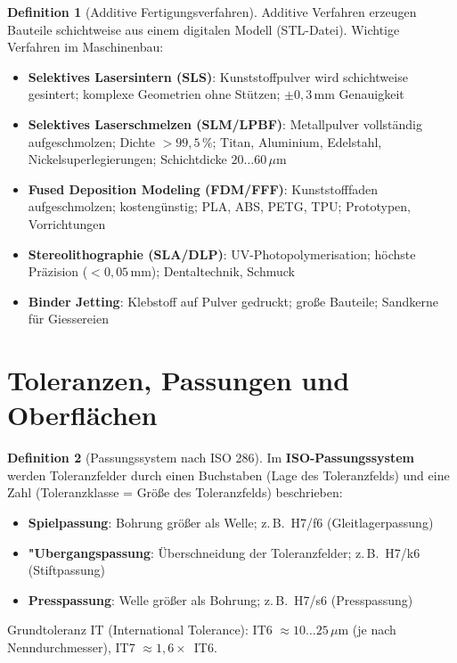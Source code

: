 ﻿\documentclass[a4paper,12pt]{report}
\theoremstyle{definition}
\newtheorem{definition}{Definition}
\begin{document}
\begin{definition}[Additive Fertigungsverfahren]
Additive Verfahren erzeugen Bauteile schichtweise aus einem digitalen Modell (STL-Datei).
Wichtige Verfahren im Maschinenbau:
\begin{itemize}
    \item[-] \textbf{Selektives Lasersintern (SLS)}: Kunststoffpulver wird schichtweise
          gesintert; komplexe Geometrien ohne Stützen; $\pm 0{,}3\,\mathrm{mm}$ Genauigkeit
    \item[-] \textbf{Selektives Laserschmelzen (SLM/LPBF)}: Metallpulver vollst\"andig
          aufgeschmolzen; Dichte $> 99{,}5\,\%$; Titan, Aluminium, Edelstahl,
          Nickelsuperlegierungen; Schichtdicke $20\ldots60\,\mu\mathrm{m}$
    \item[-] \textbf{Fused Deposition Modeling (FDM/FFF)}: Kunststofffaden aufgeschmolzen;
          kosteng\"unstig; PLA, ABS, PETG, TPU; Prototypen, Vorrichtungen
    \item[-] \textbf{Stereolithographie (SLA/DLP)}: UV-Photopolymerisation;
          h\"ochste Pr\"azision ($< 0{,}05\,\mathrm{mm}$); Dentaltechnik, Schmuck
    \item[-] \textbf{Binder Jetting}: Klebstoff auf Pulver gedruckt; gro\ss{}e Bauteile;
          Sandkerne f\"ur Giessereien
\end{itemize}
\end{definition}

\section{Toleranzen, Passungen und Oberfl\"achen}

\begin{definition}[Passungssystem nach ISO 286]
Im \textbf{ISO-Passungssystem} werden Toleranzfelder durch einen Buchstaben
(Lage des Toleranzfelds) und eine Zahl (Toleranzklasse = Gr\"o\ss{}e des Toleranzfelds) beschrieben:
\begin{itemize}
    \item[-] \textbf{Spielpassung}: Bohrung gr\"o\ss{}er als Welle; z.\,B.\ H7/f6 (Gleitlagerpassung)
    \item[-] \textbf{"Ubergangspassung}: \"Uberschneidung der Toleranzfelder; z.\,B.\ H7/k6 (Stiftpassung)
    \item[-] \textbf{Presspassung}: Welle gr\"o\ss{}er als Bohrung; z.\,B.\ H7/s6 (Presspassung)
\end{itemize}
Grundtoleranz IT (International Tolerance): IT6 $\approx 10\ldots25\,\mu\mathrm{m}$
(je nach Nenndurchmesser), IT7 $\approx 1{,}6\times$~IT6.
\end{definition}
\end{document}
